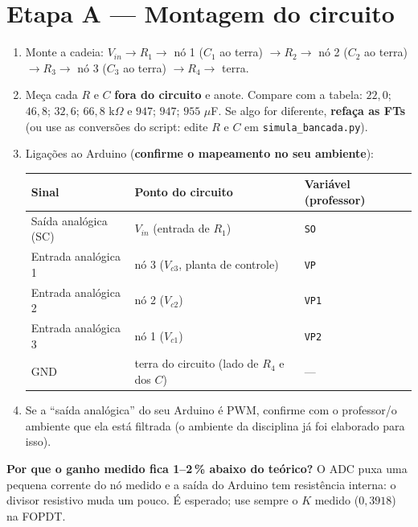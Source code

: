 \documentclass[11pt,a4paper]{article}
\newcommand{\Vc}[1]{V_{c#1}}
\newcommand{\Vin}{V_{in}}
\begin{document}
\section{Etapa A --- Montagem do circuito}
\begin{enumerate}
\item Monte a cadeia: $\Vin\to R_1\to$ nó 1 ($C_1$ ao terra) $\to R_2\to$ nó 2 ($C_2$ ao terra) $\to R_3\to$ nó 3 ($C_3$ ao terra) $\to R_4\to$ terra.
\item Meça cada $R$ e $C$ \textbf{fora do circuito} e anote. Compare com a tabela: $22{,}0$; $46{,}8$; $32{,}6$; $66{,}8$ k$\Omega$ e $947$; $947$; $955$ $\mu$F. Se algo for diferente, \textbf{refaça as FTs} (ou use as conversões do script: edite $R$ e $C$ em \texttt{simula\_bancada.py}).
\item Ligações ao Arduino (\textbf{confirme o mapeamento no seu ambiente}):
\begin{center}\small\begin{tabular}{lll}\toprule Sinal & Ponto do circuito & Variável (professor)\\\midrule
Saída analógica (SC) & $V_{in}$ (entrada de $R_1$) & \texttt{SO}\\
Entrada analógica 1 & nó 3 ($\Vc3$, planta de controle) & \texttt{VP}\\
Entrada analógica 2 & nó 2 ($\Vc2$) & \texttt{VP1}\\
Entrada analógica 3 & nó 1 ($\Vc1$) & \texttt{VP2}\\
GND & terra do circuito (lado de $R_4$ e dos $C$) & ---\\\bottomrule\end{tabular}\end{center}
\item Se a ``saída analógica'' do seu Arduino é PWM, confirme com o professor/o ambiente que ela está filtrada (o ambiente da disciplina já foi elaborado para isso).
\end{enumerate}
\begin{dica}\textbf{Por que o ganho medido fica 1--2\,\% abaixo do teórico?} O ADC puxa uma pequena corrente do nó medido e a saída do Arduino tem resistência interna: o divisor resistivo muda um pouco. É esperado; use sempre o $K$ medido ($0{,}3918$) na FOPDT.\end{dica}
\end{document}
